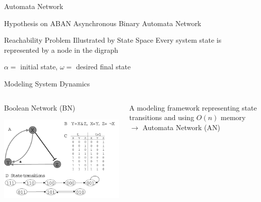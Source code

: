 \documentclass[8pt]{beamer}
\begin{document}
\begin{frame}{Automata Network}

    Hypothesis on ABAN Asynchronous Binary Automata Network
\end{frame}

\begin{frame}{Reachability Problem Illustrated by State Space}
Every system state is represented by a node in the digraph

    \vspace{0.2cm}
    {\centering
    
    
    \vspace{0.2cm}
    $\alpha=$ initial state, $\omega=$ desired final state}
    
\end{frame}

\begin{frame}{Modeling System Dynamics}
    \begin{columns}
    \begin{column}{0.45\textwidth}
    Boolean Network (BN)
    
    \vspace{0.5cm}
    \includegraphics[width=\textwidth]{figures/BooleanNetwork.png}
    \end{column}
    \pause
    \begin{column}{0.45\textwidth}
    A modeling framework representing state transitions and using $O(n)$ memory $\to$ Automata Network (AN)
    
    \pause
    \vspace{0.5cm}
    
    
    
    
    \end{column}
    \end{columns}
\end{frame}
\end{document}
